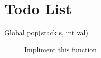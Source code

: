 \hypertarget{todo}{}\section{Todo List}\label{todo}
\label{_todo000001}
\hypertarget{todo__todo000001}{}
\begin{description}
\item[Global \hyperlink{stack_8c_a1}{pop}(stack s, int val) ]
 Impliment this function \end{description}
 